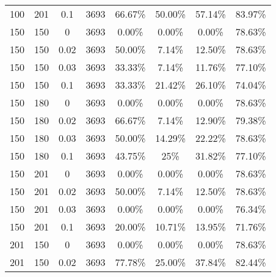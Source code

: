 \begin{table}[h]
{\begin{tabular}{cccccccc}
100                  & 201         & 0.1           & 3693         & 66.67\%            & 50.00\%         & 57.14\%     & 83.97\%           \\
150                  & 150         & 0             & 3693         & 0.00\%             & 0.00\%          & 0.00\%      & 78.63\%           \\
150                  & 150         & 0.02          & 3693         & 50.00\%            & 7.14\%          & 12.50\%     & 78.63\%           \\
150                  & 150         & 0.03          & 3693         & 33.33\%            & 7.14\%          & 11.76\%     & 77.10\%           \\
150                  & 150         & 0.1           & 3693         & 33.33\%            & 21.42\%         & 26.10\%     & 74.04\%           \\
150                  & 180         & 0             & 3693         & 0.00\%             & 0.00\%          & 0.00\%      & 78.63\%           \\
150                  & 180         & 0.02          & 3693         & 66.67\%            & 7.14\%          & 12.90\%     & 79.38\%           \\
150                  & 180         & 0.03          & 3693         & 50.00\%            & 14.29\%         & 22.22\%     & 78.63\%           \\
150                  & 180         & 0.1           & 3693         & 43.75\%            & 25\%            & 31.82\%     & 77.10\%           \\
150                  & 201         & 0             & 3693         & 0.00\%             & 0.00\%          & 0.00\%      & 78.63\%           \\
150                  & 201         & 0.02          & 3693         & 50.00\%            & 7.14\%          & 12.50\%     & 78.63\%           \\
150                  & 201         & 0.03          & 3693         & 0.00\%             & 0.00\%          & 0.00\%      & 76.34\%           \\
150                  & 201         & 0.1           & 3693         & 20.00\%            & 10.71\%         & 13.95\%     & 71.76\%           \\
201                  & 150         & 0             & 3693         & 0.00\%             & 0.00\%          & 0.00\%      & 78.63\%           \\
201                  & 150         & 0.02          & 3693         & 77.78\%            & 25.00\%         & 37.84\%     & 82.44\%           \\

\end{tabular}}
\end{table}
